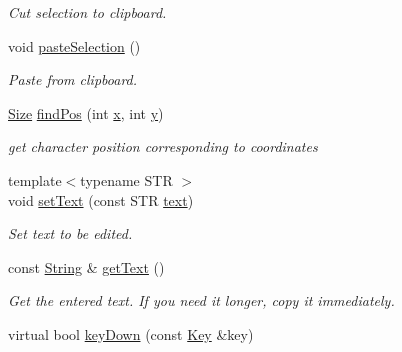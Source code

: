 \begin{DoxyCompactItemize}
\begin{DoxyCompactList}\small\item\em Cut selection to clipboard. \end{DoxyCompactList}\item 
\hypertarget{classGUI_1_1Input_a0730779bd0ce071231ccc394e0d26dfc}{void \hyperlink{classGUI_1_1Input_a0730779bd0ce071231ccc394e0d26dfc}{paste\-Selection} ()}\label{classGUI_1_1Input_a0730779bd0ce071231ccc394e0d26dfc}

\begin{DoxyCompactList}\small\item\em Paste from clipboard. \end{DoxyCompactList}\item 
\hypertarget{classGUI_1_1Input_a15a82cf692ac53c7fb91c4fd9394ad36}{\hyperlink{namespaceGUI_a10b6232e08729baa0bd211a86a69ce36}{Size} \hyperlink{classGUI_1_1Input_a15a82cf692ac53c7fb91c4fd9394ad36}{find\-Pos} (int \hyperlink{classGUI_1_1Window_a6ca6a80ca00c9e1d8ceea8d3d99a657d}{x}, int \hyperlink{classGUI_1_1Window_a0ee8e923aff2c3661fc2e17656d37adf}{y})}\label{classGUI_1_1Input_a15a82cf692ac53c7fb91c4fd9394ad36}

\begin{DoxyCompactList}\small\item\em get character position corresponding to coordinates \end{DoxyCompactList}\item 
\hypertarget{classGUI_1_1Input_adb6864a1c00db39cfe508825be97cdb1}{{\footnotesize template$<$typename S\-T\-R $>$ }\\void \hyperlink{classGUI_1_1Input_adb6864a1c00db39cfe508825be97cdb1}{set\-Text} (const S\-T\-R \hyperlink{classGUI_1_1Input_af00a3f739e0695bfbdeeb4962b4b3b65}{text})}\label{classGUI_1_1Input_adb6864a1c00db39cfe508825be97cdb1}

\begin{DoxyCompactList}\small\item\em Set text to be edited. \end{DoxyCompactList}\item 
\hypertarget{classGUI_1_1Input_a137d08ba44ae0d669d859aa3f2f0cc0b}{const \hyperlink{classGUI_1_1String}{String} \& \hyperlink{classGUI_1_1Input_a137d08ba44ae0d669d859aa3f2f0cc0b}{get\-Text} ()}\label{classGUI_1_1Input_a137d08ba44ae0d669d859aa3f2f0cc0b}

\begin{DoxyCompactList}\small\item\em Get the entered text. If you need it longer, copy it immediately. \end{DoxyCompactList}\item 
\hypertarget{classGUI_1_1Input_a5aed22f1c1783dcad253c3b1ac5a1ef8}{virtual bool \hyperlink{classGUI_1_1Input_a5aed22f1c1783dcad253c3b1ac5a1ef8}{key\-Down} (const \hyperlink{classGUI_1_1Key}{Key} \&key)}\label{classGUI_1_1Input_a5aed22f1c1783dcad253c3b1ac5a1ef8}


\end{DoxyCompactItemize}
